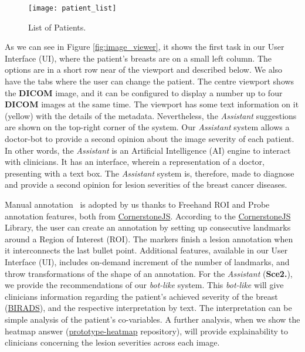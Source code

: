 \clearpage


\hfill

\begin{figure}[h]
\centering
\texttt{[image: patient\_list]}
\caption{List of Patients.}
\label{fig:patient_list}
\end{figure}

\hfill


As we can see in Figure \ref{fig:image_viewer}, it shows the first task in our User Interface (UI), where the patient's breasts are on a small left column. The options are in a short row near of the viewport and described below. We also have the tabs where the user can change the patient. The centre viewport shows the \textbf{DICOM} image, and it can be configured to display a number up to four \textbf{DICOM} images at the same time. The viewport has some text information on it (yellow) with the details of the metadata. Nevertheless, the \textit{Assistant} suggestions are shown on the top-right corner of the system. Our \textit{Assistant} system allows a doctor-bot to provide a second opinion about the image severity of each patient. In other words, the \textit{Assistant} is an Artificial Intelligence (AI) engine to interact with clinicians. It has an interface, wherein a representation of a doctor, presenting with a text box. The \textit{Assistant} system is, therefore, made to diagnose and provide a second opinion for lesion severities of the breast cancer diseases.

Manual annotation~\cite{cao2015collaborative} is adopted by us thanks to Freehand ROI and Probe annotation features, both from \hyperlink{https://cornerstonejs.org/}{CornerstoneJS}. According to the \hyperlink{https://cornerstonejs.org/}{CornerstoneJS} Library, the user can create an annotation by setting up consecutive landmarks around a Region of Interest (ROI). The markers finish a lesion annotation when it interconnects the last bullet point. Additional features, available in our User Interface (UI), includes on-demand increment of the number of landmarks, and throw transformations of the shape of an annotation. For the \textit{Assistant} (\textbf{Sce2.}), we provide the recommendations of our \textit{bot-like} system. This \textit{bot-like} will give clinicians information regarding the patient's achieved severity of the breast (\hyperlink{https://en.wikipedia.org/wiki/BI-RADS}{BIRADS}), and the respective interpretation by text. The interpretation can be simple analysis of the patient's co-variables. A further analysis, when we show the heatmap answer (\hyperlink{https://github.com/mida-project/prototype-heatmap}{prototype-heatmap} repository), will provide explainability to clinicians concerning the lesion severities across each image.

